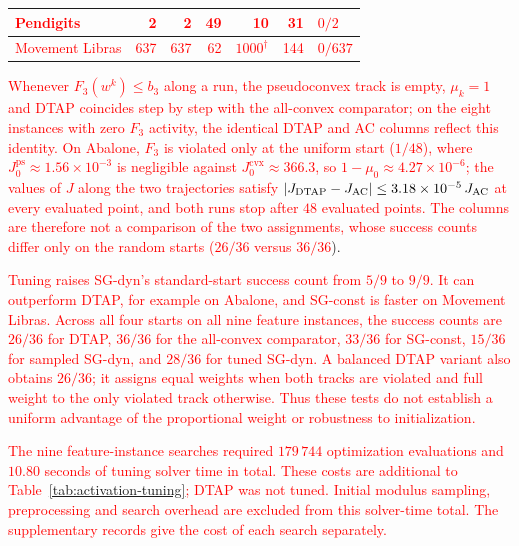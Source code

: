 \documentclass[]{interact}
\theoremstyle{plain}
\theoremstyle{definition}
\theoremstyle{remark}
\newcommand{\cvx}{\mathrm{cvx}}
\newcommand{\ps}{\mathrm{ps}}
\begin{document}
\begin{table}[t]
\begin{tabular}{@{}lrrrrrl@{}}
\leavevmode\textcolor{red}{Pendigits}    & \leavevmode\textcolor{red}{2} & \leavevmode\textcolor{red}{2} & \leavevmode\textcolor{red}{49} & \leavevmode\textcolor{red}{10} & \leavevmode\textcolor{red}{31} & \leavevmode\textcolor{red}{$0/2$}\\
\midrule
\leavevmode\textcolor{red}{Movement Libras} & \leavevmode\textcolor{red}{637} & \leavevmode\textcolor{red}{637} & \leavevmode\textcolor{red}{62} & \leavevmode\textcolor{red}{$1000^\dagger$} & \leavevmode\textcolor{red}{144} & \leavevmode\textcolor{red}{$0/637$}\\
\bottomrule
\end{tabular}
\end{table}

\leavevmode\textcolor{red}{Whenever $F_3(w^k)\le b_3$ along a run, the pseudoconvex track is empty,
$\mu_k=1$ and DTAP coincides step by step with the all-convex comparator;
on the eight instances with zero $F_3$ activity, the identical DTAP and AC
columns reflect this identity. On Abalone, $F_3$ is violated only at the uniform
start ($1/48$), where $J^{\ps}_0\approx1.56\times10^{-3}$ is negligible against
$J^{\cvx}_0\approx366.3$, so $1-\mu_0\approx4.27\times10^{-6}$; the values of $J$
along the two trajectories satisfy $|J_{\rm DTAP}-J_{\rm AC}|\le3.18\times10^{-5}\,J_{\rm AC}$ at
every evaluated point,
and both runs stop after $48$ evaluated points. The columns
are therefore not a comparison of the two assignments, whose success counts
differ only on the random starts ($26/36$ versus $36/36$}).

\leavevmode\textcolor{red}{Tuning raises SG-dyn's standard-start success count from $5/9$ to $9/9$.
It can outperform DTAP, for example on Abalone, and SG-const is faster
on Movement Libras. Across all four starts on all nine feature instances,
the success counts are $26/36$ for DTAP, $36/36$ for the all-convex
comparator, $33/36$ for SG-const, $15/36$ for sampled SG-dyn, and $28/36$
for tuned SG-dyn. A balanced DTAP variant also obtains $26/36$; it assigns
equal weights when both tracks are violated and full weight to the only violated track
otherwise. Thus these tests do not establish a uniform advantage of the proportional weight
or robustness to initialization.}

\leavevmode\textcolor{red}{The nine feature-instance searches required $179\,744$ optimization
evaluations and $10.80$ seconds of tuning solver time in total. These costs
are additional to Table~\ref{tab:activation-tuning}; DTAP was not tuned.
Initial modulus sampling, preprocessing and search overhead are excluded
from this solver-time total. The supplementary records give the cost of
each search separately.}
\end{document}
